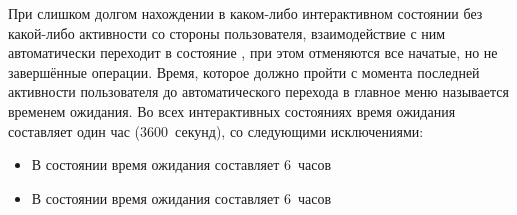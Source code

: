     При слишком долгом нахождении в каком-либо интерактивном состоянии без какой-либо активности
    со стороны пользователя, взаимодействие с ним автоматически переходит в состояние
    \hyperref[itm:req:ui:states:mainmenu]
    {}, при этом отменяются все начатые, но не завершённые операции.
    Время, которое должно пройти с момента последней активности пользователя до
    автоматического перехода в главное меню называется временем ожидания. Во всех интерактивных
    состояниях время ожидания составляет один час (3600~секунд), со следующими исключениями:
    \begin{itemize}
        \item
            В состоянии
            \hyperref[itm:req:ui:states:edit-note]
            {}
            время ожидания составляет 6~часов
        \item
            В состоянии
            \hyperref[itm:req:ui:states:create-note]
            {}
            время ожидания составляет 6~часов
    \end{itemize}
    \endgroup
